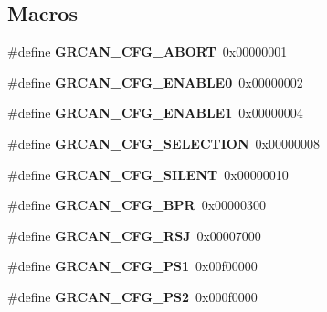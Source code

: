 \subsection*{Macros}
\begin{DoxyCompactItemize}
\item 
\mbox{\label{group__can_gaab05d52e441d8ff1d9ee9a49c41ce32d}} 
\#define {\bfseries G\+R\+C\+A\+N\+\_\+\+C\+F\+G\+\_\+\+A\+B\+O\+RT}~0x00000001
\item 
\mbox{\label{group__can_ga3d4cd14fb392976a11b313e0a6cb6f02}} 
\#define {\bfseries G\+R\+C\+A\+N\+\_\+\+C\+F\+G\+\_\+\+E\+N\+A\+B\+L\+E0}~0x00000002
\item 
\mbox{\label{group__can_ga4b76af3638c223ff54bcb51e0822377f}} 
\#define {\bfseries G\+R\+C\+A\+N\+\_\+\+C\+F\+G\+\_\+\+E\+N\+A\+B\+L\+E1}~0x00000004
\item 
\mbox{\label{group__can_ga941894e0bb9f94afffc82b84e017dee4}} 
\#define {\bfseries G\+R\+C\+A\+N\+\_\+\+C\+F\+G\+\_\+\+S\+E\+L\+E\+C\+T\+I\+ON}~0x00000008
\item 
\mbox{\label{group__can_ga4523bc2c2917ec3d6c3879bfa1f22bbd}} 
\#define {\bfseries G\+R\+C\+A\+N\+\_\+\+C\+F\+G\+\_\+\+S\+I\+L\+E\+NT}~0x00000010
\item 
\mbox{\label{group__can_ga411223827ab1575620617f1e716ef8fe}} 
\#define {\bfseries G\+R\+C\+A\+N\+\_\+\+C\+F\+G\+\_\+\+B\+PR}~0x00000300
\item 
\mbox{\label{group__can_gaa5307b6a53f251ef9970686ccfdc7ec3}} 
\#define {\bfseries G\+R\+C\+A\+N\+\_\+\+C\+F\+G\+\_\+\+R\+SJ}~0x00007000
\item 
\mbox{\label{group__can_ga26855167736636872f55d98371f44301}} 
\#define {\bfseries G\+R\+C\+A\+N\+\_\+\+C\+F\+G\+\_\+\+P\+S1}~0x00f00000
\item 
\mbox{\label{group__can_ga7bf7c6914214b7999b77a4596f5ada67}} 
\#define {\bfseries G\+R\+C\+A\+N\+\_\+\+C\+F\+G\+\_\+\+P\+S2}~0x000f0000
\item 
\mbox{\label{group__can_ga05f9f37e1436734fd390b197fdb3e544}} 

\end{DoxyCompactItemize}
